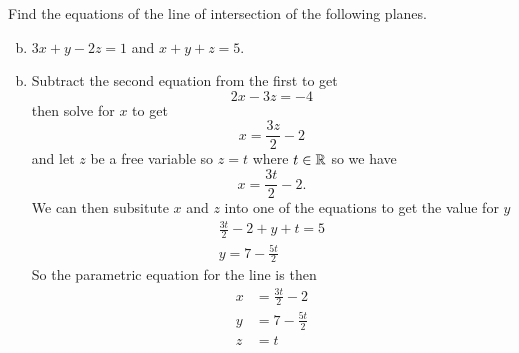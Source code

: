 \documentclass[../main.tex]{subfiles}
\begin{document}
Find the equations of the line of intersection of the following planes.
\begin{enumerate}[a)]
	\setcounter{enumi}{1}
	\item $3x + y - 2z = 1$ and $x + y + z = 5$.
\end{enumerate}

\solution
\begin{enumerate}[a)]
	\setcounter{enumi}{1}
	\item Subtract the second equation from the first to get
    \[ 2x-3z = -4 \]
    then solve for $x$ to get
    \[ x = \frac{3z}{2}-2 \]
    and let $z$ be a free variable so $z = t$ where $t \in \operatorname{\mathbb{R}}$ so we have
    \[ x = \frac{3t}{2}-2. \]
    We can then subsitute $x$ and $z$ into one of the equations to get the value for $y$
    \begin{align*}
        \frac{3t}{2}-2 + y + t = 5\\
        y = 7-\frac{5t}{2}
    \end{align*}
    So the parametric equation for the line is then
    \begin{align*}
        x &= \frac{3t}{2}-2\\
        y &= 7-\frac{5t}{2}\\
        z &= t
    \end{align*}    
\end{enumerate}
\end{document}
